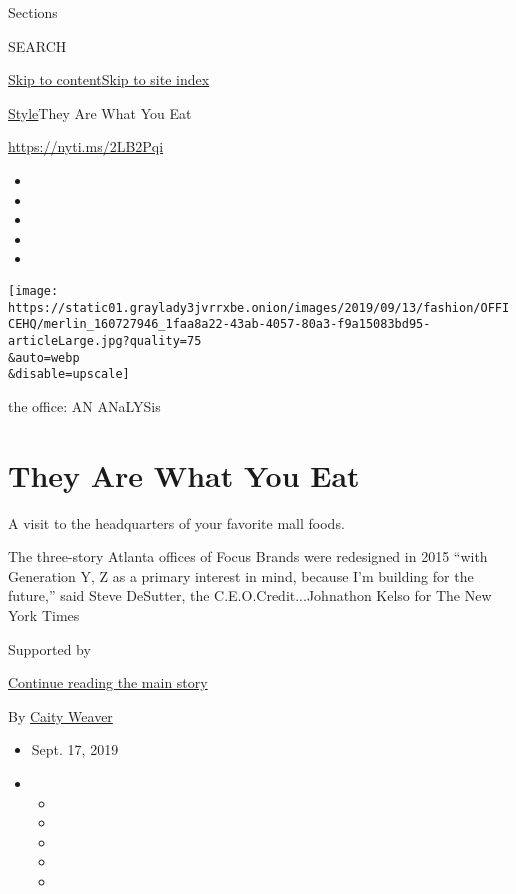 Sections

SEARCH

\protect\hyperlink{site-content}{Skip to
content}\protect\hyperlink{site-index}{Skip to site index}

\href{/section/style}{Style}\textbar{}They Are What You Eat

\url{https://nyti.ms/2LB2Pqi}

\begin{itemize}
\item
\item
\item
\item
\item
\end{itemize}

\texttt{[image: https://static01.graylady3jvrrxbe.onion/images/2019/09/13/fashion/OFFICEHQ/merlin\_160727946\_1faa8a22-43ab-4057-80a3-f9a15083bd95-articleLarge.jpg?quality=75\\\&auto=webp\\\&disable=upscale]}

the office: AN ANaLYSis

\hypertarget{they-are-what-you-eat}{%
\section{They Are What You Eat}\label{they-are-what-you-eat}}

A visit to the headquarters of your favorite mall foods.

The three-story Atlanta offices of Focus Brands were redesigned in 2015
``with Generation Y, Z as a primary interest in mind, because I'm
building for the future,'' said Steve DeSutter, the
C.E.O.Credit...Johnathon Kelso for The New York Times

Supported by

\protect\hyperlink{after-sponsor}{Continue reading the main story}

By \href{https://www.nytimes3xbfgragh.onion/by/caity-weaver}{Caity
Weaver}

\begin{itemize}
\item
  Sept. 17, 2019
\item
  \begin{itemize}
  \item
  \item
  \item
  \item
  \item
  \end{itemize}
\end{itemize}

